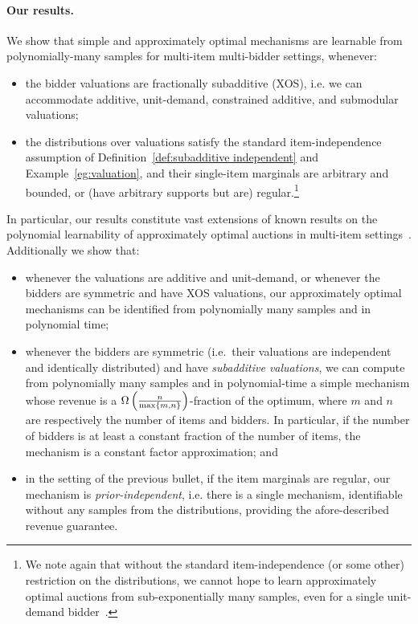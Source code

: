 \vspace{-10pt}\paragraph{Our results.} We show that simple and approximately optimal mechanisms are learnable from polynomially-many samples for multi-item multi-bidder settings, whenever:
\begin{itemize} 
\item the bidder valuations are fractionally subadditive (XOS), i.e. we can accommodate additive, unit-demand, constrained additive, and submodular valuations;
\item the distributions over valuations satisfy the standard item-independence assumption of Definition~\ref{def:subadditive independent} and Example~\ref{eg:valuation}, and their single-item marginals are arbitrary and bounded, or (have arbitrary supports but are) regular.\footnote{We note again that without the standard item-independence (or some other) restriction on the distributions, we cannot hope to learn approximately optimal auctions from sub-exponentially many samples, even for a single unit-demand bidder~\cite{DughmiHN14}.}
\end{itemize}
In particular, our results constitute vast extensions of known results on the polynomial learnability of approximately optimal auctions in multi-item settings~\cite{MorgensternR16,GoldnerK16}. Additionally we show that:
\begin{itemize}
\item whenever the valuations are additive and unit-demand, or whenever the bidders are symmetric and have XOS valuations, our approximately optimal mechanisms can be identified from polynomially many samples and in polynomial time;
\item whenever the bidders are symmetric (i.e.~their valuations are independent and identically distributed)  and have {\em subadditive valuations}, we can compute from polynomially many samples and in polynomial-time a simple mechanism whose revenue is a $\Omega\left({n \over \max\{m,n\}}\right)$-fraction of the optimum, where $m$ and $n$ are respectively the number of items and bidders. In particular, if the number of bidders is at least a constant fraction of the number of items, the mechanism is a constant factor approximation; and

\item in the setting of the previous bullet, if the item marginals are regular, our mechanism is {\em prior-independent}, i.e. there is a single mechanism, identifiable without any samples from the distributions, providing the afore-described revenue guarantee.
\end{itemize}
